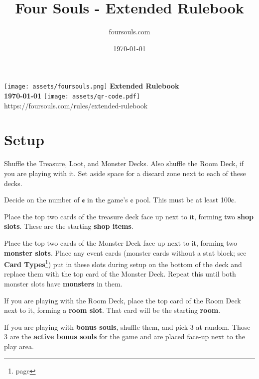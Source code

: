 \documentclass[10pt, a4paper, twoside]{article} %
\title{Four Souls - Extended Rulebook} %
\author{foursouls.com} %
\date{\today} %
\begin{document}
    \begin{titlepage}
        \centering
        \vfill
        \texttt{[image: assets/foursouls.png]}
        \vskip2cm
        {\bfseries\LARGE
        Extended Rulebook\\
        \vskip5mm
        \Large
        \today
        }
        \vskip2cm
        \texttt{[image: assets/qr-code.pdf]}\\
        https://foursouls.com/rules/extended-rulebook
    
        \cleardoublepage
    \end{titlepage}

    
    \tableofcontents

    \section{Setup}
    \label{setup}
    Shuffle the Treasure, Loot, and Monster Decks. Also shuffle the Room Deck, if you are playing with it. Set aside space for a discard zone next to each of these decks.

    Decide on the number of ¢ in the game’s ¢ pool. This must be at least 100¢.

    Place the top two cards of the treasure deck face up next to it, forming two \textbf{shop slots}. These are the starting \textbf{shop items}.

    Place the top two cards of the Monster Deck face up next to it, forming two \textbf{monster slots}. Place any event cards (monster cards without a stat block; see \textbf{Card Types}\footnote{page \pageref{types}}) put in these slots during setup on the bottom of the deck and replace them with the top card of the Monster Deck. Repeat this until both monster slots have \textbf{monsters} in them.

    If you are playing with the Room Deck, place the top card of the Room Deck next to it, forming a \textbf{room slot}. That card will be the starting \textbf{room}.

    If you are playing with \textbf{bonus souls}, shuffle them, and pick 3 at random. Those 3 are the \textbf{active bonus souls} for the game and are placed face-up next to the play area.
\end{document}
